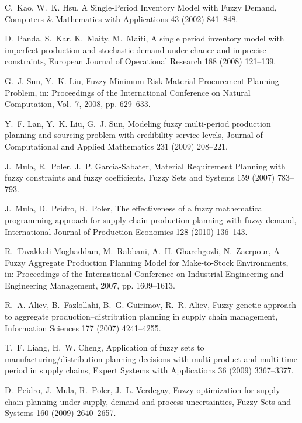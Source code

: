 \documentclass[11pt]{article}
\begin{document}
\begin{thebibliography}{10}
C.~Kao, W.~K. Hsu, A {S}ingle-{P}eriod {I}nventory {M}odel with {F}uzzy
  {D}emand, Computers \& Mathematics with Applications 43 (2002) 841--848.

D.~Panda, S.~Kar, K.~Maity, M.~Maiti, A single period inventory model with
  imperfect production and stochastic demand under chance and imprecise
  constraints, European Journal of Operational Research 188 (2008) 121--139.

G.~J. Sun, Y.~K. Liu, Fuzzy {M}inimum-{R}isk {M}aterial {P}rocurement
  {P}lanning {P}roblem, in: Proceedings of the International Conference on
  Natural Computation, Vol.~7, 2008, pp. 629--633.

Y.~F. Lan, Y.~K. Liu, G.~J. Sun, Modeling fuzzy multi-period production
  planning and sourcing problem with credibility service levels, Journal of
  Computational and Applied Mathematics 231 (2009) 208--221.

J.~Mula, R.~Poler, J.~P. Garcia-Sabater, Material {R}equirement {P}lanning with
  fuzzy constraints and fuzzy coefficients, Fuzzy Sets and Systems 159 (2007)
  783--793.

J.~Mula, D.~Peidro, R.~Poler, The effectiveness of a fuzzy mathematical
  programming approach for supply chain production planning with fuzzy demand,
  International Journal of Production Economics 128 (2010) 136--143.

R.~Tavakkoli-Moghaddam, M.~Rabbani, A.~H. Gharehgozli, N.~Zaerpour, A {F}uzzy
  {A}ggregate {P}roduction {P}lanning {M}odel for {M}ake-to-{S}tock
  {E}nvironments, in: Proceedings of the International Conference on Industrial
  Engineering and Engineering Management, 2007, pp. 1609--1613.

R.~A. Aliev, B.~Fazlollahi, B.~G. Guirimov, R.~R. Aliev, Fuzzy-genetic approach
  to aggregate production--distribution planning in supply chain management,
  Information Sciences 177 (2007) 4241--4255.

T.~F. Liang, H.~W. Cheng, Application of fuzzy sets to
  manufacturing/distribution planning decisions with multi-product and
  multi-time period in supply chains, Expert Systems with Applications 36
  (2009) 3367--3377.

D.~Peidro, J.~Mula, R.~Poler, J.~L. Verdegay, Fuzzy optimization for supply
  chain planning under supply, demand and process uncertainties, Fuzzy Sets and
  Systems 160 (2009) 2640--2657.


\end{thebibliography}
\end{document}
